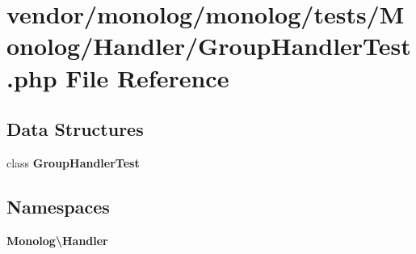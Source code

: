 \section{vendor/monolog/monolog/tests/\+Monolog/\+Handler/\+Group\+Handler\+Test.php File Reference}
\label{_group_handler_test_8php}
\subsection*{Data Structures}
\begin{DoxyCompactItemize}
\item 
class {\bf Group\+Handler\+Test}
\end{DoxyCompactItemize}
\subsection*{Namespaces}
\begin{DoxyCompactItemize}
\item 
 {\bf Monolog\textbackslash{}\+Handler}
\end{DoxyCompactItemize}
